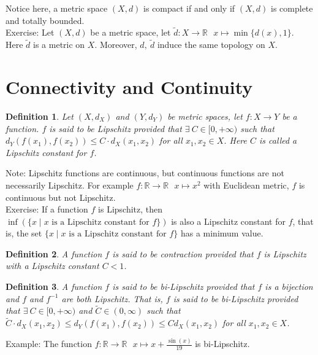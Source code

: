 \documentclass[15pt]{book}
\theoremstyle{break}
\theoremstyle{break}
\newtheorem{defn}{Definition}[corL]
\newcommand{\R}{\mathbb{R}}
\newcommand{\note}{\color{red}Note: \color{black}}
\newcommand{\example}{\color{green}Example: \color{black}}
\newcommand{\exercise}{\color{green}Exercise: \color{black}}
\begin{document}
Notice here, a metric space $(X,d)$ is compact if and only if $(X,d)$ is complete and totally bounded.\\

\exercise Let $(X,d)$ be a metric space, let $\widetilde{d}:X \to \R\ \ \ x\mapsto \min\{ d(x),1\}$.\\ 
Here $\widetilde{d}$ is a metric on $X$. Moreover, $d,\ \widetilde{d}$ induce the same topology on $X$. \\


\newpage
\section[Connectivity and Continuity]{\color{red} Connectivity and Continuity \color{black}}

\begin{defn}
Let $(X,d_X)$ and $(Y,d_Y)$ be metric spaces, let $f:X \to Y$ be a function. $f$ is said to be Lipschitz provided that $\exists\ C \in [0,+\infty)$ such that $d_Y(f(x_1),f(x_2)) \leq C \cdot d_X(x_1,x_2)$ for all $x_1,x_2 \in X$. Here $C$ is called a Lipschitz constant for $f$.
\end{defn}
\note Lipschitz functions are continuous, but continuous functions are not necessarily Lipschitz. For example $f:\R \to \R\ \ \ x\mapsto x^2$ with Euclidean metric, $f$ is continuous but not Lipschitz.\\

\exercise If a function $f$ is Lipschitz, then $\inf(\{x \mid x\text{ is a Lipschitz constant for }f\})$ is also a Lipschitz constant for $f$, that is, the set $\{x \mid x\text{ is a Lipschitz constant for }f\}$ has a minimum value.\\

\begin{defn}
A function $f$ is said to be contraction provided that $f$ is Lipschitz with a Lipschitz constant $C<1$.
\end{defn}

\begin{defn}
A function $f$ is said to be bi-Lipschitz provided that $f$ is a bijection and $f$ and $f^{-1}$ are both Lipschitz. That is, $f$ is said to be bi-Lipschitz provided that $\exists\ C \in [0,+\infty)$ and  $\widetilde{C}\in (0,\infty)$ such that $\widetilde{C}\cdot d_X(x_1,x_2) \leq d_Y(f(x_1),f(x_2)) \leq C d_X(x_1,x_2)$ for all $x_1,x_2 \in X$. 
\end{defn}

\example The function $f:\R \to \R \ \ \ x\mapsto x+\frac{\sin(x)}{19}$ is bi-Lipschitz.
\end{document}
